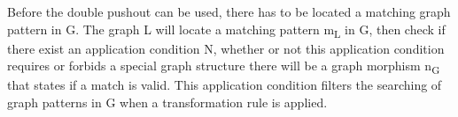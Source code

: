 Before the double pushout can be used, there has to be located a matching graph
pattern in G. The graph L will locate a matching pattern m\textsubscript{L} in
G, then check if there exist an application condition N, whether or not this application
condition requires or forbids a special graph structure there will be a graph
morphism n\textsubscript{G} that states if a match is valid. This application
condition filters the searching of graph patterns in G when a transformation
rule is applied.